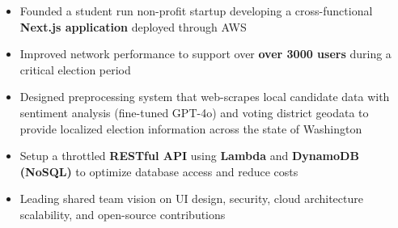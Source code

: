 \begin{itemize}
    \item Founded a student run non-profit startup developing a cross-functional \textbf{Next.js application} deployed through AWS
    \item Improved network performance to support over \textbf{over 3000 users} during a critical election period
    \item Designed preprocessing system that web-scrapes local candidate data with sentiment analysis (fine-tuned GPT-4o) and voting district geodata to provide localized election information across the state of Washington
    \item Setup a throttled \textbf{RESTful API} using \textbf{Lambda} and \textbf{DynamoDB (NoSQL)} to optimize database access and reduce costs
    \item Leading shared team vision on UI design, security, cloud architecture scalability, and open-source contributions
\end{itemize}
